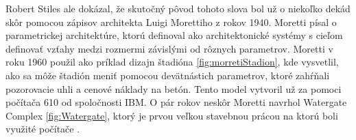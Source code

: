 Robert Stiles ale dokázal, že skutočný pôvod tohoto slova bol už o niekoľko dekád skôr pomocou zápisov architekta Luigi Morettiho z rokov 1940.  Moretti písal o parametrickej architektúre, ktorú definoval ako architektonické systémy s cieľom 
definovať vzťahy medzi rozmermi závislými od rôznych parametrov.
Moretti v roku 1960 použil ako príklad dizajn štadióna \ref{fig:morretiStadion}, kde vysvetlil, ako sa môže štadión meniť pomocou devätnástich parametrov, ktoré zahŕňali pozorovacie uhli a cenové náklady na betón. Tento model vytvoril už za pomoci počítača 610 od spoločnosti IBM\cite{doi:10.1002/ad.2019}. O pár rokov neskôr Moretti navrhol Watergate Complex \ref{fig:Watergate}, ktorý je prvou veľkou stavebnou prácou na ktorú boli využité počítače \cite{davis_2013}. 



